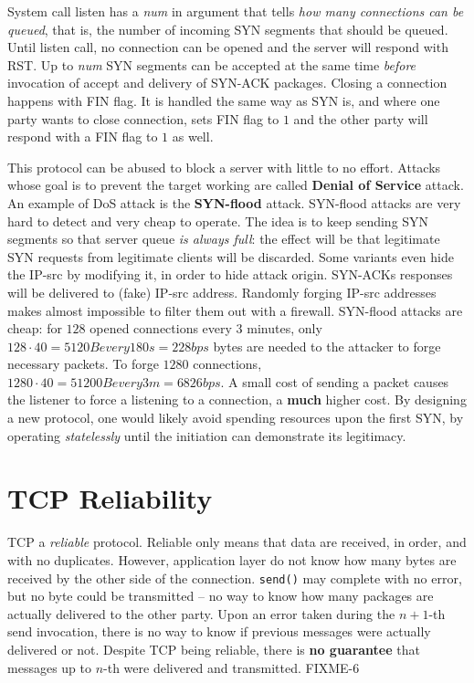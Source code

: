 \documentclass[10pt]{book}
\begin{document}
System call listen has a \emph{num} in argument that tells \emph{how many
connections can be queued}, that is, the number of incoming SYN segments that
should be queued. Until listen call, no connection can be opened and the server
will respond with RST. Up to \emph{num} SYN segments can be accepted at the
same time \emph{before} invocation of accept and delivery of SYN-ACK packages.
Closing a connection happens with FIN flag. It is handled the same way as SYN
is, and where one party wants to close connection, sets FIN flag to $1$ and the
other party will respond with a FIN flag to $1$ as well.

This protocol can be abused to block a server with little to no effort. Attacks
whose goal is to prevent the target working are called \textbf{Denial of
Service} attack. An example of DoS attack is the \textbf{SYN-flood} attack.
SYN-flood attacks are very hard to detect and very cheap to operate. The idea
is to keep sending SYN segments so that server queue \emph{is always full}: the
effect will be that legitimate SYN requests from legitimate clients will be
discarded. Some variants even hide the IP-src by modifying it, in order to hide
attack origin. SYN-ACKs responses will be delivered to (fake) IP-src address.
Randomly forging IP-src addresses makes almost impossible to filter them out
with a firewall. SYN-flood attacks are cheap: for $128$ opened connections
every $3$ minutes, only $128\cdot 40 = 5120B every 180s = 228 bps$ bytes are
needed to the attacker to forge necessary packets. To forge $1280$ connections,
$1280\cdot 40 = 51200B every 3 m = 6826bps.$ A small cost of sending a packet
causes the listener to force a listening to a connection, a \textbf{much}
higher cost. By designing a new protocol, one would likely avoid spending
resources upon the first SYN, by operating \emph{statelessly} until the
initiation can demonstrate its legitimacy.

\chapter{TCP Reliability}

TCP a \emph{reliable} protocol. Reliable only means that data are received, in
order, and with no duplicates. However, application layer do not know how many
bytes are received by the other side of the connection. \texttt{send()} may
complete with no error, but no byte could be transmitted \--- no way to know
how many packages are actually delivered to the other party. Upon an error
taken during the $n+1$-th send invocation, there is no way to know if previous
messages were actually delivered or not. Despite TCP being reliable, there is
\textbf{no guarantee} that messages up to $n$-th were delivered and
transmitted. FIXME-6
\end{document}
